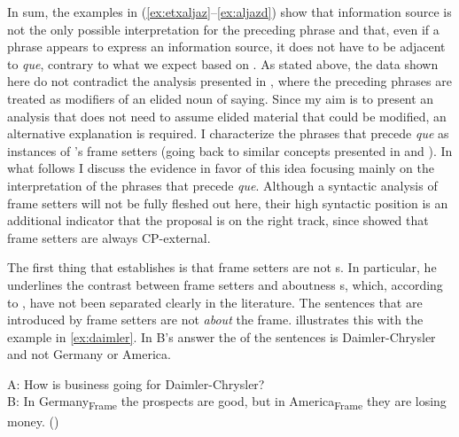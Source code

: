 In sum, the  examples in (\ref{ex:etxaljaz}--\ref{ex:aljazd}) show that information source is not  the only possible interpretation for the preceding phrase and that, even if a phrase appears to express an information source, it does not have to be adjacent to \emph{que}, contrary to what we expect based on \citet{Corr2016}. As stated above, the data shown here do not contradict the analysis presented in \citet{Etxepare2013}, where the preceding phrases are treated as modifiers of an elided noun of saying. Since my aim is to present an analysis that does not need to assume elided material that could be modified, an alternative explanation is required. I characterize the  phrases that precede \emph{que} as instances of  \citeauthor{Krifka2008}'s frame setters (going back to similar concepts presented in \citealt{Chafe1976} and \citealt{Jacobs2001}). In what follows I discuss the evidence in favor of this idea focusing mainly on the interpretation of the phrases that precede \emph{que}. Although a syntactic analysis of  frame setters will not be fully fleshed out here,  their high syntactic position is an additional indicator that the proposal is on the right track, since  \citet{Beninca2004} showed that frame setters are always CP-external.

The first thing that \citet{Krifka2008} establishes is that frame setters are not s. In particular, he underlines the contrast between frame setters and aboutness s, which, according to \citet{Jacobs2001}, have not been separated clearly in the literature. The sentences that are introduced by frame setters   are not \emph{about} the frame. \citet{Krifka2008} illustrates this with the example in \eqref{ex:daimler}. In B's answer the  of the sentences is Daimler-Chrysler and not Germany or America. 

\ea\label{ex:daimler} A: How is business going for Daimler-Chrysler?\\
	B:
	{\ob}In Germany{\cb}\textsubscript{Frame} the prospects are good, but {\ob}in America{\cb}\textsubscript{Frame} they are losing money. (\citealt[269: ex 48]{Krifka2008})
\z


